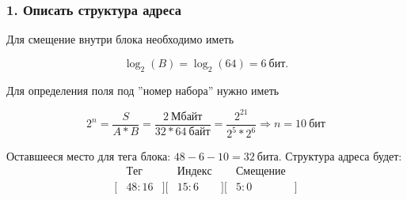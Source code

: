 
\subsubsection*{1. Описать структура адреса}

Для смещение внутри блока необходимо иметь

$$\log_2(B) = \log_2(64) = 6~бит.$$

Для определения поля под ''номер набора'' нужно иметь

$$2^n = \frac{S}{A * B} = \frac{2~Мбайт}{32*64~байт} = \frac{2^{21}}{2^5*2^6} \Rightarrow n = 10~бит$$

Оставшееся место для тега блока: $48 - 6 - 10 = 32~бита$. Структура адреса будет:
\[
\begin{matrix}
  &Тег&&Индекс&&Смещение& \\
  [&48:16&][&15:6&][&5:0&]
\end{matrix}
\]